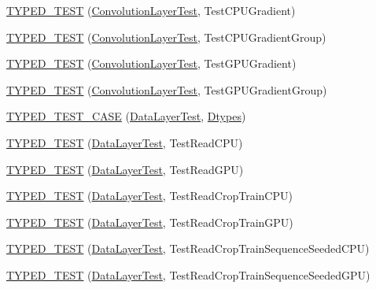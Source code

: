 \begin{DoxyCompactItemize}
\item 
\hyperlink{namespacecaffe_a638cc427610dd592267e67cbf6987865}{T\+Y\+P\+E\+D\+\_\+\+T\+E\+S\+T} (\hyperlink{classcaffe_1_1_convolution_layer_test}{Convolution\+Layer\+Test}, Test\+C\+P\+U\+Gradient)
\item 
\hyperlink{namespacecaffe_ad3e5058decc8d8cffda6eb799c3fe5c4}{T\+Y\+P\+E\+D\+\_\+\+T\+E\+S\+T} (\hyperlink{classcaffe_1_1_convolution_layer_test}{Convolution\+Layer\+Test}, Test\+C\+P\+U\+Gradient\+Group)
\item 
\hyperlink{namespacecaffe_af736ebda58cf5319dda395928a5d59cb}{T\+Y\+P\+E\+D\+\_\+\+T\+E\+S\+T} (\hyperlink{classcaffe_1_1_convolution_layer_test}{Convolution\+Layer\+Test}, Test\+G\+P\+U\+Gradient)
\item 
\hyperlink{namespacecaffe_a8ecf8ac7a1dfada6dbff7616f15819da}{T\+Y\+P\+E\+D\+\_\+\+T\+E\+S\+T} (\hyperlink{classcaffe_1_1_convolution_layer_test}{Convolution\+Layer\+Test}, Test\+G\+P\+U\+Gradient\+Group)
\item 
\hyperlink{namespacecaffe_aa3a2b2364597b34d0bc3b75efe6600be}{T\+Y\+P\+E\+D\+\_\+\+T\+E\+S\+T\+\_\+\+C\+A\+S\+E} (\hyperlink{classcaffe_1_1_data_layer_test}{Data\+Layer\+Test}, \hyperlink{namespacecaffe_a131dc2be50f2f10e18450da61cde6b57}{Dtypes})
\item 
\hyperlink{namespacecaffe_a30406ecf88d2a63fc2aa516167d63a2e}{T\+Y\+P\+E\+D\+\_\+\+T\+E\+S\+T} (\hyperlink{classcaffe_1_1_data_layer_test}{Data\+Layer\+Test}, Test\+Read\+C\+P\+U)
\item 
\hyperlink{namespacecaffe_a2407d8c9cb5002d3a77d11d956a2d17f}{T\+Y\+P\+E\+D\+\_\+\+T\+E\+S\+T} (\hyperlink{classcaffe_1_1_data_layer_test}{Data\+Layer\+Test}, Test\+Read\+G\+P\+U)
\item 
\hyperlink{namespacecaffe_acebf34167249d5bf7e68a755250a78a0}{T\+Y\+P\+E\+D\+\_\+\+T\+E\+S\+T} (\hyperlink{classcaffe_1_1_data_layer_test}{Data\+Layer\+Test}, Test\+Read\+Crop\+Train\+C\+P\+U)
\item 
\hyperlink{namespacecaffe_af65195f437b83c168b94d92c7bce775c}{T\+Y\+P\+E\+D\+\_\+\+T\+E\+S\+T} (\hyperlink{classcaffe_1_1_data_layer_test}{Data\+Layer\+Test}, Test\+Read\+Crop\+Train\+G\+P\+U)
\item 
\hyperlink{namespacecaffe_a29bd1b7dc5b42bd2c8b6fb09bbfc2cbb}{T\+Y\+P\+E\+D\+\_\+\+T\+E\+S\+T} (\hyperlink{classcaffe_1_1_data_layer_test}{Data\+Layer\+Test}, Test\+Read\+Crop\+Train\+Sequence\+Seeded\+C\+P\+U)
\item 
\hyperlink{namespacecaffe_a5cbab8d009ecf9567995b59f4f60d2bc}{T\+Y\+P\+E\+D\+\_\+\+T\+E\+S\+T} (\hyperlink{classcaffe_1_1_data_layer_test}{Data\+Layer\+Test}, Test\+Read\+Crop\+Train\+Sequence\+Seeded\+G\+P\+U)

\end{DoxyCompactItemize}

